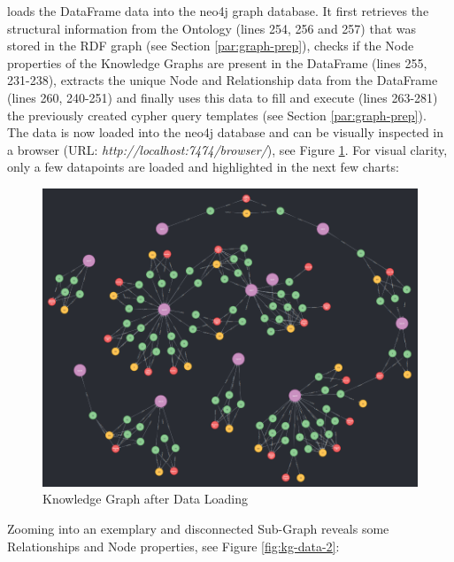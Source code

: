 loads the DataFrame data into the neo4j graph database.
It first retrieves the structural information from the Ontology (lines 254, 256 and 257) that was stored in the RDF graph (see Section \ref{par:graph-prep}),
checks if the Node properties of the Knowledge Graphs are present in the DataFrame (lines 255, 231-238),
extracts the unique Node and Relationship data from the DataFrame (lines 260, 240-251)
and finally uses this data to fill and execute (lines 263-281) the previously created \gls{cypher} query templates (see Section \ref{par:graph-prep}).\\

The data is now loaded into the neo4j database and can be visually inspected in a browser (URL: \emph{http://localhost:7474/browser/}), see Figure \ref{fig:kg-data-1}.
For visual clarity, only a few datapoints are loaded and highlighted in the next few charts:


\begin{figure}[H]   %
    \centering
    \includegraphics[width=1.0\textwidth]{Assets/kg-data-1}
    \caption{Knowledge Graph after Data Loading}
    \label{fig:kg-data-1}
\end{figure}

Zooming into an exemplary and disconnected Sub-Graph reveals some Relationships and Node properties, see Figure \ref{fig:kg-data-2}:

